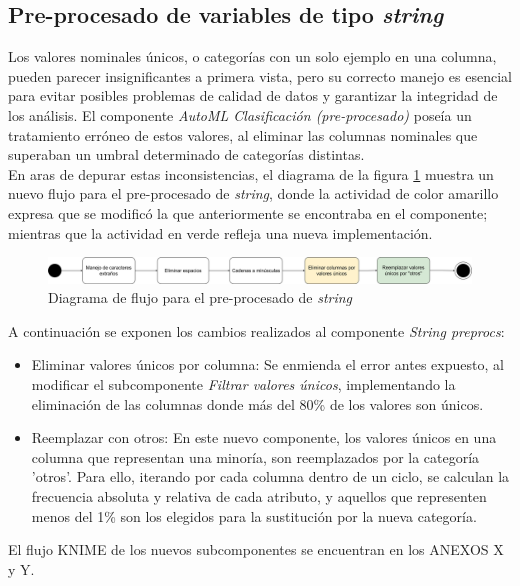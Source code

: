 \subsection{Pre-procesado de variables de tipo \textit{string}}
Los valores nominales únicos, o categorías con un solo ejemplo en una columna, pueden parecer insignificantes a primera vista, pero su correcto manejo es esencial para evitar posibles problemas de calidad de datos y garantizar la integridad de los análisis. El componente \textit{AutoML Clasificación (pre-procesado)} poseía un tratamiento erróneo de estos valores, al eliminar las columnas nominales que superaban un umbral determinado de categorías distintas. \\ 
En aras de depurar estas inconsistencias, el diagrama de la figura \ref{fig:string-preprocs} muestra un nuevo flujo para el pre-procesado de \textit{string}, donde la actividad de color amarillo expresa que se modificó la que anteriormente se encontraba en el componente; mientras que la actividad en verde refleja una nueva implementación.

\begin{figure}[H]
	\centering
	\includegraphics[width=0.95\linewidth]{"figuras/capi 2/preprocesado/string preprocs.drawio"}
	\caption{Diagrama de flujo para el pre-procesado de \textit{string}}
	\label{fig:string-preprocs}
\end{figure}

A continuación se exponen los cambios realizados al componente \textit{String preprocs}:
\begin{itemize}
	\item Eliminar valores únicos por columna:  Se enmienda el error antes expuesto, al modificar el subcomponente \textit{Filtrar valores únicos}, implementando la eliminación de las columnas donde más del 80\% de los valores son únicos.
	\item Reemplazar con otros: En este nuevo componente, los valores únicos en una columna que representan una minoría, son reemplazados por la categoría 'otros'.  Para ello, iterando por cada columna dentro de un ciclo, se calculan la frecuencia absoluta y relativa de cada atributo, y aquellos que representen menos del 1\% son los elegidos para la sustitución por la nueva categoría. 
\end{itemize}
El flujo KNIME de los nuevos subcomponentes se encuentran en los ANEXOS X y Y.


